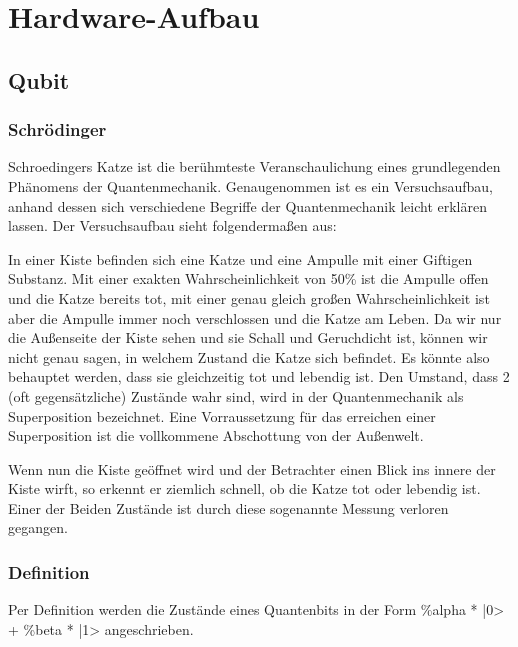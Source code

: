 
\section{Hardware-Aufbau}
\label{sec:Hardware-Aufbau}


\subsection{Qubit}
\label{sec:Qubit}

\subsubsection{Schrödinger}

Schroedingers Katze ist die berühmteste Veranschaulichung eines grundlegenden Phänomens der Quantenmechanik. Genaugenommen ist es ein Versuchsaufbau, anhand dessen sich verschiedene Begriffe der Quantenmechanik leicht erklären lassen. Der Versuchsaufbau sieht folgendermaßen aus:

In einer Kiste befinden sich eine Katze und eine Ampulle mit einer Giftigen Substanz. Mit einer exakten Wahrscheinlichkeit von 50\% ist die Ampulle offen und die Katze bereits tot, mit einer genau gleich großen Wahrscheinlichkeit ist aber die Ampulle immer noch verschlossen und die Katze am Leben. Da wir nur die Außenseite der Kiste sehen und sie Schall und Geruchdicht ist, können wir nicht genau sagen, in welchem Zustand die Katze sich befindet. Es könnte also behauptet werden, dass sie gleichzeitig tot und lebendig ist.
Den Umstand, dass 2 (oft gegensätzliche) Zustände wahr sind, wird in der Quantenmechanik als Superposition bezeichnet. Eine Vorraussetzung für das erreichen einer Superposition ist die vollkommene Abschottung von der Außenwelt. 

Wenn nun die Kiste geöffnet wird und der Betrachter einen Blick ins innere der Kiste wirft, so erkennt er ziemlich schnell, ob die Katze tot oder lebendig ist. Einer der Beiden Zustände ist durch diese sogenannte Messung verloren gegangen.

\subsubsection{Definition}

Per Definition werden die Zustände eines Quantenbits in der Form \%alpha * |0> + \%beta * |1> angeschrieben.

